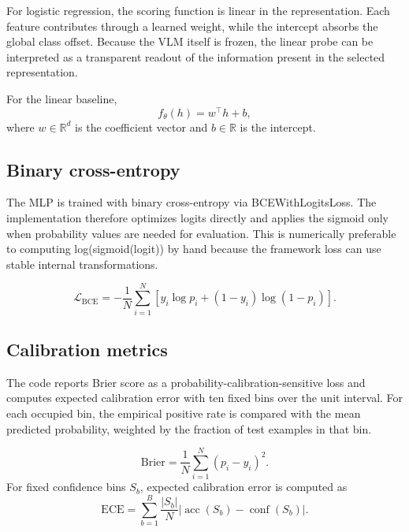 \documentclass[11pt,a4paper]{article}
\begin{document}
For logistic regression, the scoring function is linear in the representation. Each feature contributes through a learned weight, while the intercept absorbs the global class offset. Because the VLM itself is frozen, the linear probe can be interpreted as a transparent readout of the information present in the selected representation.

For the linear baseline,
\begin{equation}
f_{\theta}(h)=w^{\top}h+b,
\label{eq:linear-probe}
\end{equation}
where $w\in\mathbb{R}^{d}$ is the coefficient vector and $b\in\mathbb{R}$ is the intercept.

\subsection{Binary cross-entropy}

The MLP is trained with binary cross-entropy via BCEWithLogitsLoss. The implementation therefore optimizes logits directly and applies the sigmoid only when probability values are needed for evaluation. This is numerically preferable to computing log(sigmoid(logit)) by hand because the framework loss can use stable internal transformations.

\begin{equation}
\mathcal{L}_{\mathrm{BCE}}=-\frac{1}{N}\sum_{i=1}^{N}
\left[y_i\log p_i+(1-y_i)\log(1-p_i)\right].
\label{eq:bce}
\end{equation}

\subsection{Calibration metrics}

The code reports Brier score as a probability-calibration-sensitive loss and computes expected calibration error with ten fixed bins over the unit interval. For each occupied bin, the empirical positive rate is compared with the mean predicted probability, weighted by the fraction of test examples in that bin.

\begin{equation}
\mathrm{Brier}=\frac{1}{N}\sum_{i=1}^{N}(p_i-y_i)^2.
\label{eq:brier}
\end{equation}
For fixed confidence bins $S_b$, expected calibration error is computed as
\begin{equation}
\mathrm{ECE}=\sum_{b=1}^{B}\frac{|S_b|}{N}
\left|\operatorname{acc}(S_b)-\operatorname{conf}(S_b)\right|.
\label{eq:ece}
\end{equation}
\end{document}
